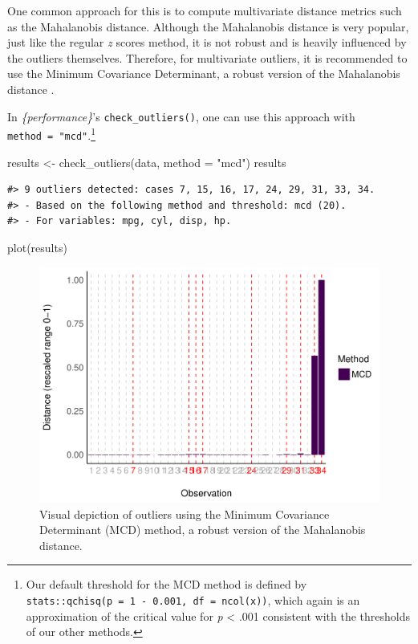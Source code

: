 \documentclass[mathematics,article,submit,moreauthors,pdftex]{mdpi}
\newenvironment{Shaded}{\begin{snugshade}}{\end{snugshade}}
\newcommand{\AttributeTok}[1]{\textcolor[rgb]{0.77,0.63,0.00}{#1}}
\newcommand{\FunctionTok}[1]{\textcolor[rgb]{0.00,0.00,0.00}{#1}}
\newcommand{\NormalTok}[1]{#1}
\newcommand{\OtherTok}[1]{\textcolor[rgb]{0.56,0.35,0.01}{#1}}
\newcommand{\StringTok}[1]{\textcolor[rgb]{0.31,0.60,0.02}{#1}}
\begin{document}
One common approach for this is to compute multivariate distance metrics
such as the Mahalanobis distance. Although the Mahalanobis distance is
very popular, just like the regular \emph{z} scores method, it is not
robust and is heavily influenced by the outliers themselves. Therefore,
for multivariate outliers, it is recommended to use the Minimum
Covariance Determinant, a robust version of the Mahalanobis distance
\citep[MCD,][]{leys2018outliers, leys2019outliers}.

In \emph{\{performance\}}'s \texttt{check\_outliers()}, one can use this
approach with \texttt{method\ =\ "mcd"}.\footnote{Our default threshold
  for the MCD method is defined by
  \texttt{stats::qchisq(p\ =\ 1\ -\ 0.001,\ df\ =\ ncol(x))}, which
  again is an approximation of the critical value for \emph{p}
  \textless{} .001 consistent with the thresholds of our other methods.}

\begin{Shaded}
\begin{Highlighting}[]
\NormalTok{results }\OtherTok{\textless{}{-}} \FunctionTok{check\_outliers}\NormalTok{(data, }\AttributeTok{method =} \StringTok{"mcd"}\NormalTok{)}
\NormalTok{results}
\end{Highlighting}
\end{Shaded}

\begin{verbatim}
#> 9 outliers detected: cases 7, 15, 16, 17, 24, 29, 31, 33, 34.
#> - Based on the following method and threshold: mcd (20).
#> - For variables: mpg, cyl, disp, hp.
\end{verbatim}

\begin{Shaded}
\begin{Highlighting}[]
\FunctionTok{plot}\NormalTok{(results)}
\end{Highlighting}
\end{Shaded}

\begin{figure}
\includegraphics[width=1\linewidth]{paper_files/figure-latex/multivariate-1} \caption{Visual depiction of outliers using the Minimum Covariance Determinant (MCD) method, a robust version of the Mahalanobis distance.}\label{fig:multivariate}
\end{figure}
\end{document}
